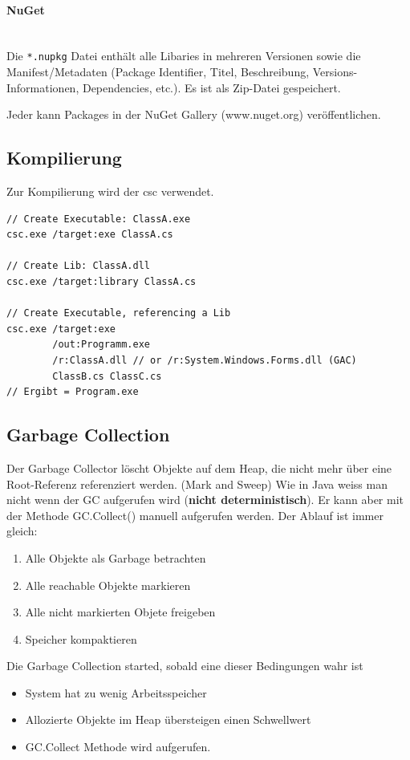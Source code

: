 \documentclass[
a4paper,
oneside,
10pt,
fleqn,
headsepline,
toc=listofnumbered, 
bibliography=totocnumbered]{scrartcl}
\begin{document}
\paragraph{NuGet}\mbox{} \\
Die \lstinline|*.nupkg| Datei enthält alle Libaries in mehreren Versionen sowie die Manifest/Metadaten (Package Identifier, Titel, Beschreibung, Versions-Informationen, Dependencies, etc.). Es ist als Zip-Datei gespeichert.

Jeder kann Packages in der NuGet Gallery (www.nuget.org) veröffentlichen.
\clearpage

\subsection{Kompilierung}
Zur Kompilierung wird der \gls{csc} verwendet.
\begin{lstlisting}
// Create Executable: ClassA.exe
csc.exe /target:exe ClassA.cs

// Create Lib: ClassA.dll
csc.exe /target:library ClassA.cs

// Create Executable, referencing a Lib
csc.exe /target:exe
		/out:Programm.exe
		/r:ClassA.dll // or /r:System.Windows.Forms.dll (GAC)
		ClassB.cs ClassC.cs
// Ergibt = Program.exe
\end{lstlisting}

\subsection{Garbage Collection}
Der Garbage Collector löscht Objekte auf dem Heap, die nicht mehr über eine Root-Referenz referenziert werden. (Mark and Sweep) Wie in Java weiss man nicht wenn der GC aufgerufen wird (\textbf{nicht deterministisch}). Er kann aber mit der Methode GC.Collect() manuell aufgerufen werden. Der Ablauf ist immer gleich:
\begin{enumerate}
	\item Alle Objekte als Garbage betrachten
	\item Alle reachable Objekte markieren
	\item Alle nicht markierten Objete freigeben
	\item Speicher kompaktieren
\end{enumerate}

Die Garbage Collection started, sobald eine dieser Bedingungen wahr ist
\begin{itemize}
	\item System hat zu wenig Arbeitsspeicher
	\item Allozierte Objekte im Heap übersteigen einen Schwellwert
	\item GC.Collect Methode wird aufgerufen.
\end{itemize}
\end{document}
